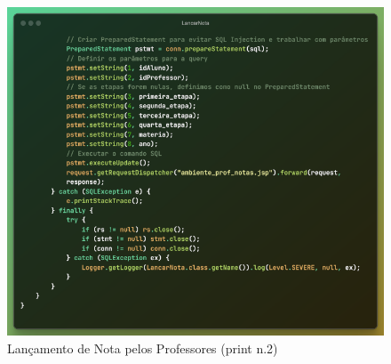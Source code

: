 \documentclass[main.tex]{subfiles}
\begin{document}
\begin{figure}[H]
    \centering
    \includegraphics[scale=0.63]{imagens/code_scrs/5-lancarNota2.png}
    \caption{Lançamento de Nota pelos Professores (print n.2)}
\end{figure}
\end{document}
